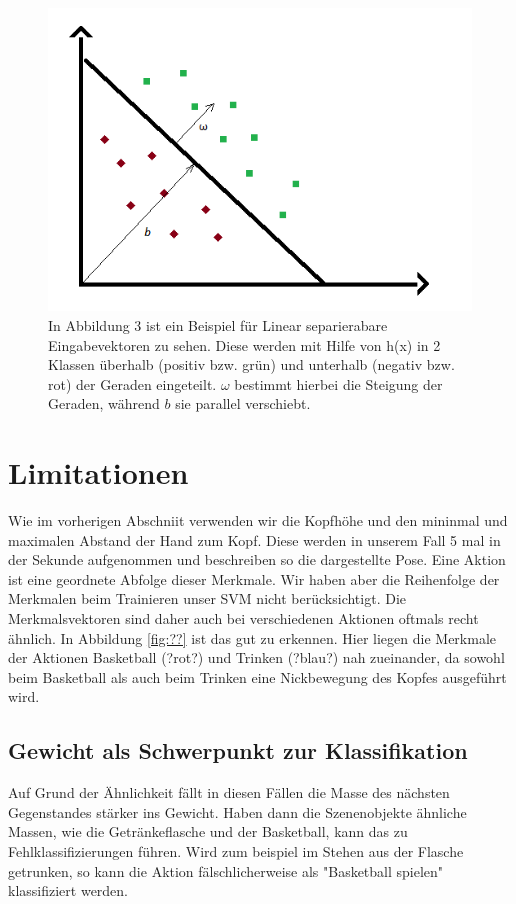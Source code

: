 \begin{figure}[hbtp]
\includegraphics[width=0.7\linewidth]{LinSeparabel.png}
\centering
\caption{In Abbildung 3 ist ein Beispiel für Linear separierabare Eingabevektoren zu sehen. Diese werden mit Hilfe von h(x) in 2 Klassen überhalb (positiv bzw. grün) und unterhalb (negativ bzw. rot) der Geraden eingeteilt. $\omega$ bestimmt hierbei die Steigung der Geraden, während $b$ sie parallel verschiebt.}
\label{fig:LinSeparabel}
\end{figure}

\section{Limitationen}
Wie im vorherigen Abschniit verwenden wir die Kopfhöhe und den mininmal und maximalen Abstand der Hand zum Kopf. Diese werden in unserem Fall 5 mal in der Sekunde aufgenommen und beschreiben so die dargestellte Pose. Eine Aktion ist eine geordnete Abfolge dieser Merkmale. Wir haben aber die Reihenfolge der Merkmalen beim Trainieren unser SVM nicht berücksichtigt. Die Merkmalsvektoren sind daher auch bei verschiedenen Aktionen oftmals recht ähnlich. In Abbildung \ref{fig:??} ist das gut zu erkennen. Hier liegen die Merkmale der Aktionen Basketball (?rot?) und Trinken (?blau?) nah zueinander, da sowohl beim Basketball als auch beim Trinken eine Nickbewegung des Kopfes ausgeführt wird.

\subsection{Gewicht als Schwerpunkt zur Klassifikation}
Auf Grund der Ähnlichkeit fällt in diesen Fällen die Masse des nächsten Gegenstandes stärker ins Gewicht. Haben dann die Szenenobjekte ähnliche Massen, wie die Getränkeflasche und der Basketball, kann das zu Fehlklassifizierungen führen.  Wird zum beispiel im Stehen aus der Flasche getrunken, so kann die Aktion fälschlicherweise als "Basketball spielen" klassifiziert werden. 



